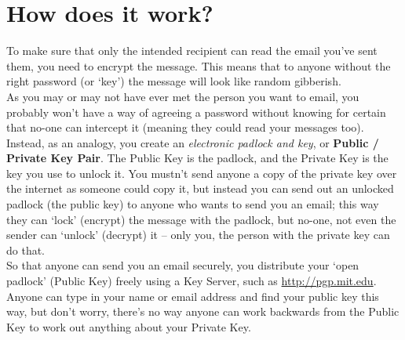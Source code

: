 \section{How does it work?}
To make sure that only the intended recipient can read the email you've sent them, you need to encrypt the message. This means that to anyone without the right password (or `key') the message will look like random gibberish. \\As you may or may not have ever met the person you want to email, you probably won't have a way of agreeing a password without knowing for certain that no-one can intercept it (meaning they could read your messages too). Instead, as an analogy, you create an \textit{electronic padlock and key}, or \textbf{Public / Private Key Pair}. The Public Key is the padlock, and the Private Key is the key you use to unlock it. You mustn't send anyone a copy of the private key over the internet as someone could copy it, but instead you can send out an unlocked padlock (the public key) to anyone who wants to send you an email; this way they can `lock' (encrypt) the message with the padlock, but no-one, not even the sender can `unlock' (decrypt) it -- only you, the person with the private key can do that.\\ So that anyone can send you an email securely, you distribute your `open padlock' (Public Key) freely using a Key Server, such as \href{http://pgp.mit.edu}{http://pgp.mit.edu}. Anyone can type in your name or email address and find your public key this way, but don't worry, there's no way anyone can work backwards from the Public Key to work out anything about your Private Key.

